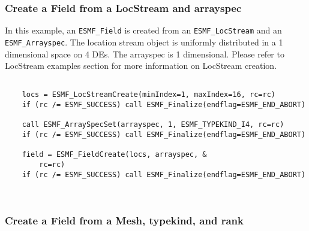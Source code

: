 
  \subsubsection{Create a Field from a LocStream and arrayspec}
  \label{sec:field:usage:create_locs_arrayspec}
   
   In this example, an {\tt ESMF\_Field} is created from an {\tt ESMF\_LocStream} 
   and an {\tt ESMF\_Arrayspec}.
   The location stream object is uniformly distributed
   in a 1 dimensional space on 4 DEs. The arrayspec is 1 dimensional. 
   Please refer to LocStream examples section for more information on LocStream creation.
   

 \begin{verbatim}

    locs = ESMF_LocStreamCreate(minIndex=1, maxIndex=16, rc=rc)
    if (rc /= ESMF_SUCCESS) call ESMF_Finalize(endflag=ESMF_END_ABORT)

    call ESMF_ArraySpecSet(arrayspec, 1, ESMF_TYPEKIND_I4, rc=rc)
    if (rc /= ESMF_SUCCESS) call ESMF_Finalize(endflag=ESMF_END_ABORT)

    field = ESMF_FieldCreate(locs, arrayspec, &
        rc=rc)
    if (rc /= ESMF_SUCCESS) call ESMF_Finalize(endflag=ESMF_END_ABORT)

 
\end{verbatim}
 

  \subsubsection{Create a Field from a Mesh, typekind, and rank}
  \label{sec:field:usage:create_mesh_tkr}
   
